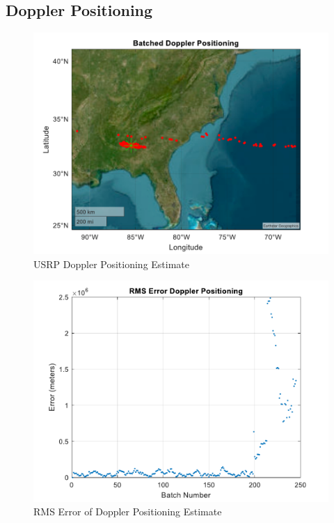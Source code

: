 \documentclass[12pt]{report}
\begin{document}
\subsection{Doppler Positioning}
\begin{figure}[h!]
    \centering
    \includegraphics[width=5in]
    {15min_irid_USRP_dopplerposit.pdf}
    \caption{USRP Doppler Positioning Estimate}
    \label{fig:USRPDoppler15minIridPosit}
\end{figure}

\begin{figure}[h!]
    \centering
    \includegraphics[width=5in]
    {15min_irid_USRP_doppler_rsme.pdf}
    \caption{RMS Error of Doppler Positioning Estimate}
    \label{fig:USRPDoppler15minIridRMSE}
\end{figure}
\end{document}
